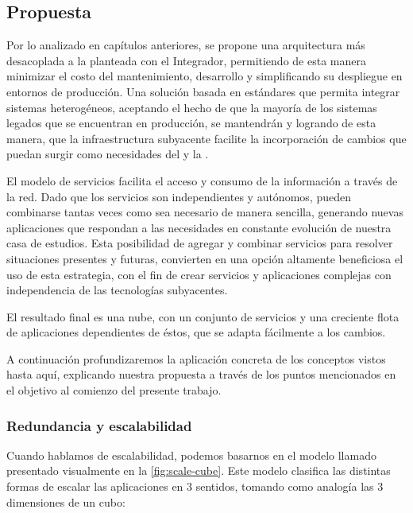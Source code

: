 \subsection{Propuesta}
\label{propuesta}

Por lo analizado en capítulos anteriores, se propone una arquitectura más desacoplada a la planteada con el Integrador, permitiendo de esta manera minimizar el costo del mantenimiento, desarrollo y simplificando su despliegue en entornos de producción. Una solución basada en estándares que permita integrar sistemas heterogéneos, aceptando el hecho de que la mayoría de los sistemas legados que se encuentran en producción, se mantendrán y logrando de esta manera, que la infraestructura subyacente facilite la incorporación de cambios que puedan surgir como necesidades del {\cespi} y la {\unlp}.

El modelo de servicios facilita el acceso y consumo de la información a través de la red. Dado que los servicios son independientes y autónomos, pueden combinarse tantas veces como sea necesario de manera sencilla, generando nuevas aplicaciones que respondan a las necesidades en constante evolución de nuestra casa de estudios. Esta posibilidad de agregar y combinar servicios para resolver situaciones presentes y futuras, convierten en una opción altamente beneficiosa el uso de esta estrategia, con el fin de crear servicios y aplicaciones complejas con independencia de las tecnologías subyacentes\cite{microsoft2006}.

El resultado final es una nube, con un conjunto de servicios y una creciente flota de aplicaciones dependientes de éstos, que se adapta fácilmente a los cambios.

A continuación profundizaremos la aplicación concreta de los conceptos vistos hasta aquí, explicando nuestra propuesta a través de los puntos mencionados en el objetivo al comienzo del presente trabajo.

\subsubsection{Redundancia y escalabilidad}
\label{propuesta:escalabilidad}

Cuando hablamos de escalabilidad, podemos basarnos en el modelo llamado \cite{website:akfpartners-scale-cube} presentado visualmente en la \autoref{fig:scale-cube}. Este modelo clasifica las distintas formas de escalar las aplicaciones en 3 sentidos, tomando como analogía las 3 dimensiones de un cubo:

